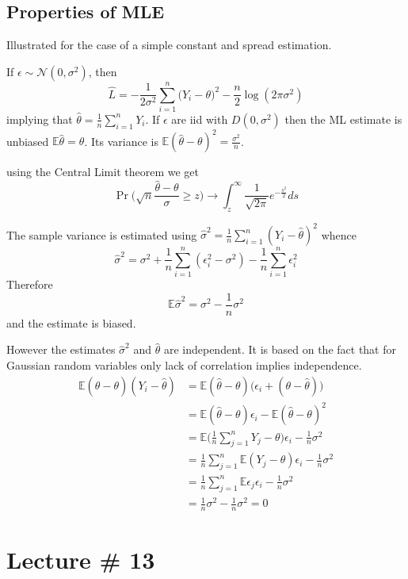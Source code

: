 \documentclass[a4paper]{article}
\newcommand{\Ncal}{\mathcal{N}}
\newcommand{\Ex}{\mathbb{E}}
\begin{document}

\subsection{Properties of MLE} %
\label{sub:properties_of_mle}
Illustrated for the case of a simple constant and spread estimation.

If $\epsilon\sim \Ncal(0,\sigma^2)$, then 
\[\hat{L} = -\frac{1}{2\sigma^2}\sum_{i=1}^n\big(Y_i-\theta\big)^2 - \frac{n}{2}\log(2\pi \sigma^2)\]
implying that $\hat{\theta} = \frac{1}{n}\sum_{i=1}^n Y_i$.
If $\epsilon$ are iid with $D(0,\sigma^2)$ then the ML estimate is unbiased $\Ex \hat{\theta} = \theta$.
Its variance is $\Ex (\hat{\theta}-\theta)^2 = \frac{\sigma^2}{n}$.

using the Central Limit theorem we get
\[\Pr\big(\sqrt{n} \frac{\hat{\theta}-\theta}{\sigma} \geq z\big)\to \int_z^\infty \frac{1}{\sqrt{2\pi}} e^{-\frac{s^2}{2}}ds \]

The sample variance is estimated using $\hat{\sigma}^2 = \frac{1}{n}\sum_{i=1}^n(Y_i - \hat{\theta})^2$ whence
\[\hat{\sigma}^2 = \sigma^2 + \frac{1}{n}\sum_{i=1}^n (\epsilon_i^2 - \sigma^2) - \frac{1}{n} \sum_{i=1}^n \epsilon_i^2\]
Therefore
\[\Ex \hat{\sigma}^2 = \sigma^2 - \frac{1}{n}\sigma^2 \]
and the estimate is biased.

However the estimates $\hat{\sigma}^2$ and $\hat{\theta}$ are independent. It is based on the fact that for Gaussian random variables only lack of correlation implies independence.
\begin{align*}
	\Ex (\hat{\theta}-\theta) (Y_i - \hat{\theta})
	&= \Ex (\hat{\theta}-\theta) \big(\epsilon_i + (\theta - \hat{\theta}) \big) \\
	&= \Ex (\hat{\theta}-\theta)\epsilon_i - \Ex (\hat{\theta}-\theta)^2 \\
	&= \Ex \Big(\frac{1}{n}\sum_{j=1}^n Y_j-\theta\Big)\epsilon_i - \frac{1}{n}\sigma^2 \\
	&= \frac{1}{n}\sum_{j=1}^n \Ex (Y_j - \theta)\epsilon_i - \frac{1}{n}\sigma^2 \\
	&= \frac{1}{n}\sum_{j=1}^n \Ex \epsilon_j\epsilon_i - \frac{1}{n}\sigma^2 \\
	&= \frac{1}{n}\sigma^2 - \frac{1}{n}\sigma^2 = 0
\end{align*}



\section{Lecture \# 13} %
\label{sec:lecture_13}
\end{document}
